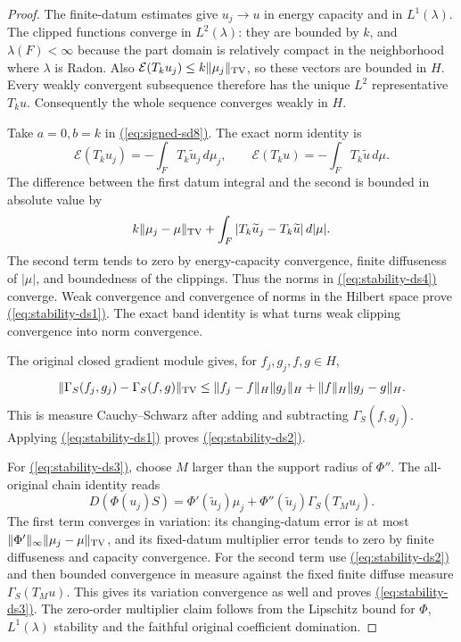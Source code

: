 \documentclass[11pt,reqno]{amsart}
\theoremstyle{definition}
\theoremstyle{remark}
\numberwithin{equation}{section}
\newcommand{\MathEqref}[1]{\begingroup\hypersetup{linkcolor=EquationLink}\hyperref[#1]{(\ref*{#1})}\endgroup}
\begin{document}
\begin{proof}
The finite-datum estimates give $u_j\to u$ in energy capacity
and in $L^1(\lambda)$.  The clipped functions converge in
$L^2(\lambda)$: they are bounded by $k$, and $\lambda(F)<\infty$
because the part domain is relatively compact in the neighborhood
where $\lambda$ is Radon.  Also
$\mathcal E(T_ku_j)\leq k\|\mu_j\|_{\rm TV}$, so these
vectors are bounded in $H$.  Every weakly convergent subsequence
therefore has the unique $L^2$ representative $T_ku$.
Consequently the whole sequence converges weakly in $H$.

Take $a=0,b=k$ in \MathEqref{eq:signed-sd8}.  The exact norm identity is
\begin{equation}\label{eq:stability-ds4}
 \mathcal E(T_ku_j)=-\int_F T_k\widetilde u_j\,d\mu_j,
 \qquad
 \mathcal E(T_ku)=-\int_F T_k\widetilde u\,d\mu.
\end{equation}
The difference between the first datum integral and the second
is bounded in absolute value by
\begin{equation}\label{eq:stability-ds5}
 k\|\mu_j-\mu\|_{\rm TV}
       +\int_F|T_k\widetilde u_j-T_k\widetilde u|\,d|\mu|.
\end{equation}
The second term tends to zero by energy-capacity convergence,
finite diffuseness of $|\mu|$, and boundedness of the clippings.
Thus the norms in \MathEqref{eq:stability-ds4} converge.  Weak convergence and convergence
of norms in the Hilbert space prove \MathEqref{eq:stability-ds1}.  The exact band identity is what turns weak clipping convergence
into norm convergence.

The original closed gradient module gives, for $f_j,g_j,f,g\in H$,
\begin{equation}\label{eq:stability-ds6}
 \|\Gamma_S(f_j,g_j)-\Gamma_S(f,g)\|_{\rm TV}
  \leq \|f_j-f\|_H\|g_j\|_H
                         +\|f\|_H\|g_j-g\|_H.
\end{equation}
This is measure Cauchy--Schwarz after adding and subtracting
$\Gamma_S(f,g_j)$.  Applying \MathEqref{eq:stability-ds1} proves \MathEqref{eq:stability-ds2}.

For \MathEqref{eq:stability-ds3}, choose $M$ larger than the support radius of $\Phi''$.
The all-original chain identity reads
\begin{equation}\label{eq:stability-ds7}
 D(\Phi(u_j)S)=\Phi'(\widetilde u_j)\mu_j
       +\Phi''(\widetilde u_j)\Gamma_S(T_Mu_j).
\end{equation}
The first term converges in variation: its changing-datum error
is at most $\|\Phi'\|_\infty\|\mu_j-\mu\|_{\rm TV}$,
and its fixed-datum multiplier error tends to zero by finite
diffuseness and capacity convergence.  For the second term use
\MathEqref{eq:stability-ds2} and then bounded convergence in measure against the fixed
finite diffuse measure $\Gamma_S(T_Mu)$.  This gives its variation
convergence as well and proves \MathEqref{eq:stability-ds3}.  The zero-order multiplier
claim follows from the Lipschitz bound for $\Phi$, $L^1(\lambda)$
stability and the faithful original coefficient domination.


\end{proof}
\end{document}
